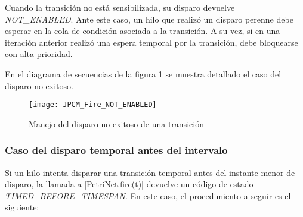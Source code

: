 Cuando la transición no está sensibilizada, su disparo devuelve
\textit{NOT\_ENABLED}. Ante este caso, un hilo que realizó un disparo perenne
debe esperar en la cola de condición asociada a la transición. A su vez, si en
una iteración anterior realizó una espera temporal por la transición, debe
bloquearse con alta prioridad.
 
En el diagrama de secuencias de la figura \ref{fig:JPCM_Fire_NOT_ENABLED} se muestra
detallado el caso del disparo no exitoso.

\begin{figure}[H]
  \texttt{[image: JPCM\_Fire\_NOT\_ENABLED]}
  \caption{Manejo del disparo no exitoso de una transición}
  \label{fig:JPCM_Fire_NOT_ENABLED}
\end{figure}

\subsubsection*{Caso del disparo temporal antes del intervalo}
Si un hilo intenta disparar una transición temporal antes del instante menor de
disparo, la llamada a |PetriNet.fire(t)| devuelve un código de estado
\textit{TIMED\_BEFORE\_TIMESPAN}.
En este caso, el procedimiento a seguir es el siguiente:
